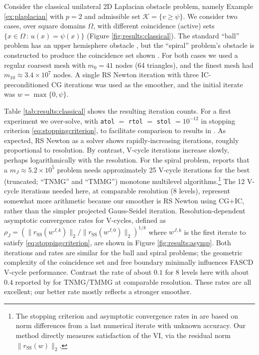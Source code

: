 \documentclass[review,hidelinks,onefignum,onetabnum,final]{siamart220329}  %
\newcommand{\rSS}{r_{\text{SS}}}
\begin{document}
\begin{example} \label{ex:results:classical}
Consider the classical unilateral 2D Laplacian obstacle problem, namely Example \ref{ex:plaplacian} with $p=2$ and admissible set $\mathcal{K} = \{v \ge \psi\}$.  We consider two cases, over square domains $\Omega$, with different coincidence (active) sets $\{x\in\Omega \,:\, u(x)=\psi(x)\}$ (Figure \ref{fig:results:classical}).  The standard ``ball'' problem has an upper hemisphere obstacle \cite[Chapter 12]{Bueler2021}, but the ``spiral'' problem's obstacle is constructed to produce the coincidence set shown \cite[problem 7.1.1]{GraeserKornhuber2009}.  For both cases we used a regular coarsest mesh with $m_0=41$ nodes (64 triangles), and the finest mesh had $m_{10} \approx 3.4 \times 10^7$ nodes.  A single RS Newton iteration with three IC-preconditioned CG iterations was used as the smoother, and the initial iterate was $w=\max\{0,\psi\}$.

Table \ref{tab:results:classical} shows the resulting iteration counts.  For a first experiment we over-solve, with \texttt{atol} $=$ \texttt{rtol} $=$ \texttt{stol} $= 10^{-12}$ in stopping criterion \eqref{eq:stoppingcriterion}, to facilitate comparison to results in \cite[section 7]{GraeserKornhuber2009}.  As expected, RS Newton as a solver shows rapidly-increasing iterations, roughly proportional to resolution.  By contrast, V-cycle iterations increase slowly, perhaps logarithmically with the resolution.  For the spiral problem, \cite[Figure 7.11]{GraeserKornhuber2009} reports that a $m_J \approx 5.2 \times 10^5$ problem needs approximately 25 V-cycle iterations for the best (truncated;  ``TNMG'' and ``TMMG'') monotone multilevel algorithms.\footnote{The stopping criterion and asymptotic convergence rates in \cite{GraeserKornhuber2009} are based on norm differences from a last numerical iterate with unknown accuracy.  Our method directly measures satisfaction of the VI, via the residual norm $\|\rSS(w)\|_2$.}  The 12 V-cycle iterations needed here, at comparable resolution (8 levels), represent somewhat more arithmetic because our smoother is RS Newton using CG+IC, rather than the simpler projected Gauss-Seidel iteration.  Resolution-dependent asymptotic convergence rates for V-cycles, defined as $\rho_J=(\|\rSS(w^{J,k})\|_2/\|\rSS(w^{J,0})\|_2)^{1/k}$ where $w^{J,k}$ is the first iterate to satisfy \eqref{eq:stoppingcriterion}, are shown in Figure \ref{fig:results:asymp}.  Both iterations and rates are similar for the ball and spiral problems; the geometric complexity of the coincidence set and free boundary minimally influences FASCD V-cycle performance.  Contrast the rate of about $0.1$ for 8 levels here with about $0.4$ reported by \cite[Figure 7.11]{GraeserKornhuber2009} for TNMG/TMMG at comparable resolution.  These rates are all excellent; our better rate mostly reflects a stronger smoother.


\end{example}
\end{document}
